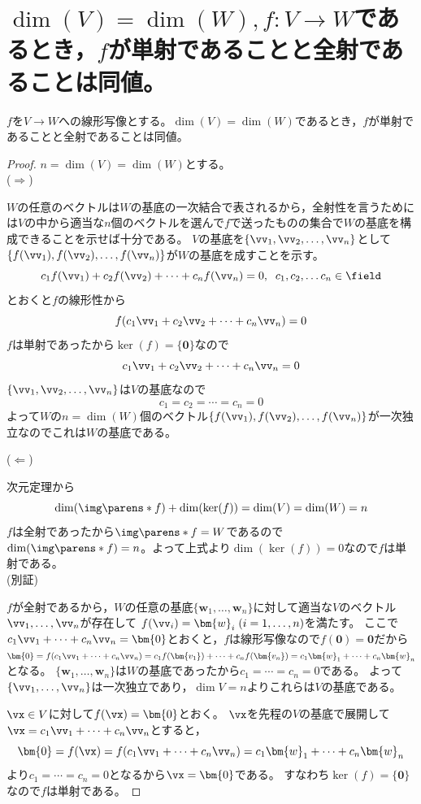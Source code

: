     \section{\texorpdfstring{$\dim(V)=\dim(W),f:V\to W$}{dim(V)=dim(W), f:V→W}であるとき，\texorpdfstring{$f$}{f}が単射であることと全射であることは同値。}
        \begin{shadebox}
            $f$を$V\rightarrow W$への線形写像とする。$\dim(V)=\dim(W)$であるとき，$f$が単射であることと全射であることは同値。
        \end{shadebox}
        \begin{proof}
            $n=\dim(V)=\dim(W)$とする。\\
            ($\Rightarrow$)
            \par
            $W$の任意のベクトルは$W$の基底の一次結合で表されるから，全射性を言うためには$V$の中から適当な$n$個のベクトルを選んで$f$で送ったものの集合で$W$の基底を構成できることを示せば十分である。
            $V$の基底を$\{\vv_1,\vv_2,\dots,\vv_n\}$として$\{f(\vv_1),f(\vv_2),\dots,f(\vv_n)\}$が$W$の基底を成すことを示す。
            \[c_1f(\vv_1)+c_2f(\vv_2)+\dotsb+c_nf(\vv_n) = 0,\;\;c_1,c_2,\dots c_n\in\field\]
            とおくと$f$の線形性から
            \[f(c_1\vv_1+c_2\vv_2+\dotsb+c_n\vv_n) = 0\]
            $f$は単射であったから$\ker(f)=\{\bm{0}\}$なので
            \[c_1\vv_1+c_2\vv_2+\dotsb+c_n\vv_n = 0\]
            $\{\vv_1,\vv_2,\dots,\vv_n\}$は$V$の基底なので
            \[c_1=c_2=\dotsb=c_n = 0\]
            よって$W$の$n=\dim(W)$個のベクトル$\{f(\vv_1),f(\vv_2),\dots,f(\vv_n)\}$が一次独立なのでこれは$W$の基底である。
            \newline\par
            \noindent
            ($\Leftarrow$)
            \par
            次元定理から
            \[\dim(\img\parens*{f}) + \dim(\ker(f)) = \dim(V) = \dim(W) = n\]
            $f$は全射であったから$\img\parens*{f}=W$であるので$\dim(\img\parens*{f}) = n$。よって上式より$\dim(\ker(f)) = 0$なので$f$は単射である。\\
            (別証)
            \par
            $f$が全射であるから，$W$の任意の基底$\{\bm{w}_1,\dotsc,\bm{w}_n\}$に対して適当な$V$のベクトル$\vv_1,\dotsc,\vv_n$が存在して
            $f(\vv_i)=\bm{w}_i\;(i=1,\dotsc,n)$を満たす。
            ここで$c_1\vv_1 + \dotsb + c_n\vv_n = \bm{0}$とおくと，$f$は線形写像なので$f(\bm{0})=\bm{0}$だから$\bm{0} = f(c_1\vv_1 + \dotsb + c_n\vv_n) = c_1f(\bm{v_1}) + \dotsb + c_nf(\bm{v_n}) = c_1\bm{w}_1 + \dotsb + c_n\bm{w}_n$となる。
            $\{\bm{w}_1,\dotsc,\bm{w}_n\}$は$W$の基底であったから$c_1=\dotsb=c_n=0$である。
            よって$\{\vv_1,\dotsc,\vv_n\}$は一次独立であり，$\dim{V}=n$よりこれらは$V$の基底である。
            \par
            $\vx\in V$に対して$f(\vx)=\bm{0}$とおく。
            $\vx$を先程の$V$の基底で展開して$\vx=c_1\vv_1+\dotsb+c_n\vv_n$とすると，
            \[\bm{0} = f(\vx) = f(c_1\vv_1+\dotsb+c_n\vv_n) = c_1\bm{w}_1 + \dotsb + c_n\bm{w}_n\]
            より$c_1=\dotsb=c_n=0$となるから$\vx=\bm{0}$である。
            すなわち$\ker(f)=\{\bm{0}\}$なので$f$は単射である。
        \end{proof}
